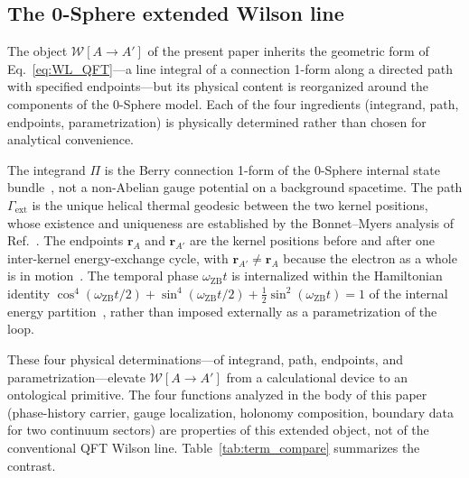 \documentclass[%
 reprint, amsmath,amssymb, aps, prb, ]{revtex4-2}
\numberwithin{equation}{section}
\newcommand{\omZB}{\omega_{\text{ZB}}}
\newcommand{\WL}{\mathcal{W}}
\begin{document}
\subsection{The 0-Sphere extended Wilson line}

The object $\WL[A\to A']$ of the present paper inherits the geometric form of Eq.~\eqref{eq:WL_QFT}---a line integral of a connection 1-form along a directed path with specified endpoints---but its physical content is reorganized around the components of the 0-Sphere model. Each of the four ingredients (integrand, path, endpoints, parametrization) is physically determined rather than chosen for analytical convenience.

The integrand $\Pi$ is the Berry connection 1-form of the 0-Sphere internal state bundle~\cite{hanamura26, hanamura51}, not a non-Abelian gauge potential on a background spacetime. The path $\Gamma_{\text{ext}}$ is the unique helical thermal geodesic between the two kernel positions, whose existence and uniqueness are established by the Bonnet--Myers analysis of Ref.~\cite{hanamura51}. The endpoints $\mathbf{r}_A$ and $\mathbf{r}_{A'}$ are the kernel positions before and after one inter-kernel energy-exchange cycle, with $\mathbf{r}_{A'} \neq \mathbf{r}_A$ because the electron as a whole is in motion~\cite{hanamura43}. The temporal phase $\omZB t$ is internalized within the Hamiltonian identity $\cos^4(\omZB t/2) + \sin^4(\omZB t/2) + \tfrac{1}{2}\sin^2(\omZB t) = 1$ of the internal energy partition~\cite{hanamura01}, rather than imposed externally as a parametrization of the loop.

These four physical determinations---of integrand, path, endpoints, and parametrization---elevate $\WL[A\to A']$ from a calculational device to an ontological primitive. The four functions analyzed in the body of this paper (phase-history carrier, gauge localization, holonomy composition, boundary data for two continuum sectors) are properties of this extended object, not of the conventional QFT Wilson line. Table~\ref{tab:term_compare} summarizes the contrast.
\end{document}
